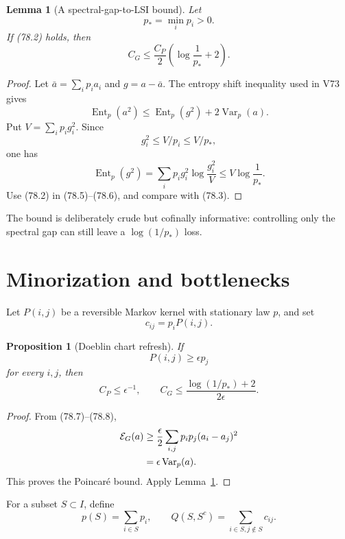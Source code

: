 \documentclass[11pt]{article}
\newtheorem{proposition}[theorem]{Proposition}
\newtheorem{lemma}[theorem]{Lemma}
\theoremstyle{remark}
\begin{document}
\begin{lemma}[A spectral-gap-to-LSI bound]
\label{lem:v15v78-gap-lsi}
Let
\[
 p_*=\min_i p_i>0.
\]
If (78.2) holds, then
\[
 C_G
 \leq
 \frac{C_P}{2}\left(\log\frac1{p_*}+2\right).          \tag{78.4}
\]
\end{lemma}

\begin{proof}
Let \(\bar a=\sum_ip_ia_i\) and \(g=a-\bar a\).  The entropy shift
inequality used in V73 gives
\[
 \operatorname{Ent}_p(a^2)
 \leq\operatorname{Ent}_p(g^2)+2\operatorname{Var}_p(a).
                                                               \tag{78.5}
\]
Put \(V=\sum_ip_ig_i^2\).  Since
\[
 g_i^2\leq V/p_i\leq V/p_*,
\]
one has
\[
 \operatorname{Ent}_p(g^2)
 =
 \sum_ip_ig_i^2\log\frac{g_i^2}{V}
 \leq V\log\frac1{p_*}.                               \tag{78.6}
\]
Use (78.2) in (78.5)--(78.6), and compare with (78.3).
\end{proof}

The bound is deliberately crude but cofinally informative:
controlling only the spectral gap can still leave a
\(\log(1/p_*)\) loss.

\section{Minorization and bottlenecks}

Let \(P(i,j)\) be a reversible Markov kernel with stationary law
\(p\), and set
\[
 c_{ij}=p_iP(i,j).                                    \tag{78.7}
\]

\begin{proposition}[Doeblin chart refresh]
\label{prop:v15v78-doeblin}
If
\[
 P(i,j)\geq\epsilon p_j                               \tag{78.8}
\]
for every \(i,j\), then
\[
 C_P\leq\epsilon^{-1},\qquad
 C_G\leq
 \frac{\log(1/p_*)+2}{2\epsilon}.                     \tag{78.9}
\]
\end{proposition}

\begin{proof}
From (78.7)--(78.8),
\[
\begin{split}
 {\cal E}_G(a)
 &\geq
 \frac{\epsilon}{2}
 \sum_{i,j}p_ip_j(a_i-a_j)^2\\
 &=\epsilon\operatorname{Var}_p(a).
\end{split}
\]
This proves the Poincar\'e bound.  Apply
Lemma~\ref{lem:v15v78-gap-lsi}.
\end{proof}

For a subset \(S\subset I\), define
\[
 p(S)=\sum_{i\in S}p_i,\qquad
 Q(S,S^c)=\sum_{i\in S,j\notin S}c_{ij}.              \tag{78.10}
\]
\end{document}
